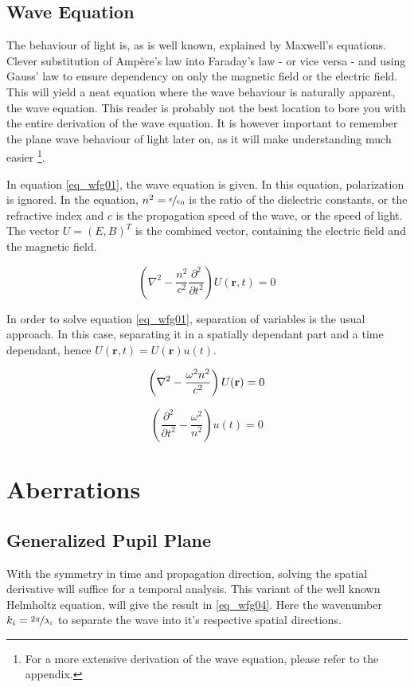 \documentclass{article}
\begin{document}
\subsection{Wave Equation}
The behaviour of light is, as is well known, explained by Maxwell's equations. Clever substitution of Amp\`{e}re's law into Faraday's law - or vice versa - and using Gauss' law to ensure dependency on only the magnetic field or the electric field. This will yield a neat equation where the wave behaviour is naturally apparent, the wave equation. This reader is probably not the best location to bore you with the entire derivation of the wave equation. It is however important to remember the plane wave behaviour of light later on, as it will make understanding much easier \footnote{For a more extensive derivation of the wave equation, please refer to the appendix.}.

In equation \ref{eq_wfg01}, the wave equation is given. In this equation, polarization is ignored. In the equation, $n^2 = \nicefrac{\epsilon}{\epsilon_0}$ is the ratio of the dielectric constants, or the refractive index and $c$ is the propagation speed of the wave, or the speed of light. The vector $U = (E, B)^T$ is the combined vector, containing the electric field and the magnetic field.

\begin{equation}
\label{eq_wfg01}
\left( \nabla^2 - \frac{n^2}{c^2} \frac{\partial^2}{\partial t^2} \right) U(\textbf{r},t) = 0 
\end{equation}

In order to solve equation \ref{eq_wfg01}, separation of variables is the usual approach. In this case, separating it in a spatially dependant part and a time dependant, hence $U(\textbf{r},t) = U(\textbf{r}) u(t)$. 

\begin{equation}
\label{eq_wfg02}
\left(\nabla^2 - \frac{\omega^2 n^2}{c^2}\right) U(\textbf{r}) = 0\\
\end{equation}
	
\begin{equation}
\label{eq_wfg03}
\left(\frac{\partial^2}{\partial t^2}- \frac{\omega^2}{n^2}\right) u(t) = 0
\end{equation}

\newpage
\section{Aberrations}
\subsection{Generalized Pupil Plane}
With the symmetry in time and propagation direction, solving the spatial derivative will suffice for a temporal analysis. This variant of the well known Helmholtz equation, will give the result in \ref{eq_wfg04}. Here the wavenumber $k_i = \nicefrac{2\pi}{\lambda_i}$ to separate the wave into it's respective spatial directions.
\end{document}
